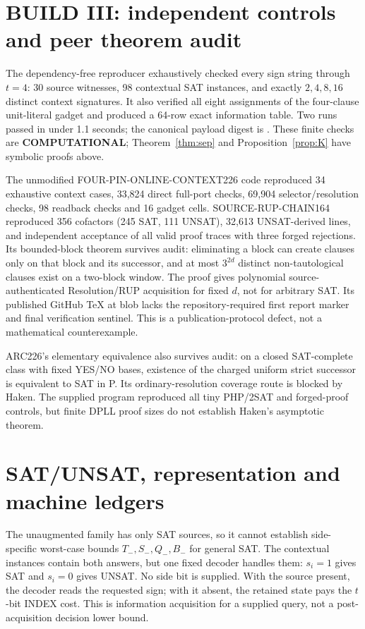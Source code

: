 \documentclass[11pt]{article}
\begin{document}
\section{BUILD III: independent controls and peer theorem audit}
The dependency-free reproducer exhaustively checked every sign string through
$t=4$: 30 source witnesses, 98 contextual SAT instances, and exactly
$2,4,8,16$ distinct context signatures.  It also verified all eight assignments
of the four-clause unit-literal gadget and produced a 64-row exact information
table.  Two runs passed in under 1.1 seconds; the canonical payload digest is
\texttt{}.
These finite checks are \textbf{COMPUTATIONAL}; Theorem~\ref{thm:sep} and
Proposition~\ref{prop:K} have symbolic proofs above.

The unmodified FOUR-PIN-ONLINE-CONTEXT226 code reproduced 34 exhaustive
context cases, 33,824 direct full-port checks, 69,904 selector/resolution
checks, 98 readback checks and 16 gadget cells.  SOURCE-RUP-CHAIN164 reproduced
356 cofactors (245 SAT, 111 UNSAT), 32,613 UNSAT-derived lines, and independent
acceptance of all valid proof traces with three forged rejections.  Its
bounded-block theorem survives audit: eliminating a block can create clauses
only on that block and its successor, and at most $3^{2d}$ distinct
non-tautological clauses exist on a two-block window.  The proof gives
polynomial source-authenticated Resolution/RUP acquisition for fixed $d$, not
for arbitrary SAT.  Its published GitHub TeX at blob
\texttt{} lacks the
repository-required first report marker and final verification sentinel.  This
is a publication-protocol defect, not a mathematical counterexample.

ARC226's elementary equivalence also survives audit: on a closed SAT-complete
class with fixed YES/NO bases, existence of the charged uniform strict
successor is equivalent to SAT in P.  Its ordinary-resolution coverage route
is blocked by Haken.  The supplied program reproduced all tiny PHP/2SAT and
forged-proof controls, but finite DPLL proof sizes do not establish Haken's
asymptotic theorem.

\section{SAT/UNSAT, representation and machine ledgers}
The unaugmented family has only SAT sources, so it cannot establish side-specific
worst-case bounds $T_-,S_-,Q_-,B_-$ for general SAT.  The contextual instances
contain both answers, but one fixed decoder handles them: $s_i=1$ gives SAT and
$s_i=0$ gives UNSAT.  No side bit is supplied.  With the source present, the
decoder reads the requested sign; with it absent, the retained state pays the
$t$-bit INDEX cost.  This is information acquisition for a supplied query, not
a post-acquisition decision lower bound.
\end{document}
